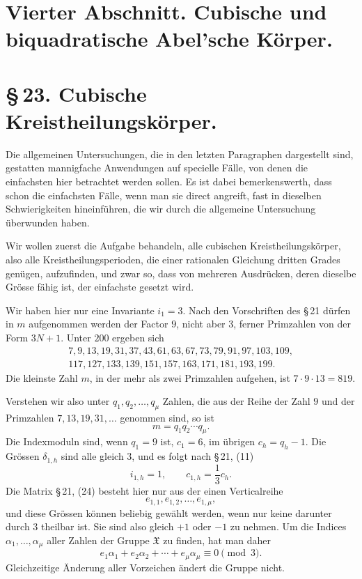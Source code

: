 \documentclass[11pt]{article}
\providecommand{\grpX}{\mathfrak X}
\begin{document}
\section*{Vierter Abschnitt. Cubische und biquadratische Abel'sche Körper.}

\section*{\S\,23. Cubische Kreistheilungskörper.}

Die allgemeinen Untersuchungen, die in den letzten Paragraphen dargestellt sind, gestatten mannigfache Anwendungen auf specielle Fälle, von denen die einfachsten hier betrachtet werden sollen. Es ist dabei bemerkenswerth, dass schon die einfachsten Fälle, wenn man sie direct angreift, fast in dieselben Schwierigkeiten hineinführen, die wir durch die allgemeine Untersuchung überwunden haben.

Wir wollen zuerst die Aufgabe behandeln, alle cubischen Kreistheilungskörper, also alle Kreistheilungsperioden, die einer rationalen Gleichung dritten Grades genügen, aufzufinden, und zwar so, dass von mehreren Ausdrücken, deren dieselbe Grösse fähig ist, der einfachste gesetzt wird.

Wir haben hier nur eine Invariante $i_1=3$. Nach den Vorschriften des \S\,21 dürfen in $m$ aufgenommen werden der Factor $9$, nicht aber $3$, ferner Primzahlen von der Form $3N+1$. Unter $200$ ergeben sich
\[
\begin{gathered}
7,9,13,19,31,37,43,61,63,67,73,79,91,97,103,109,\\
117,127,133,139,151,157,163,171,181,193,199.
\end{gathered}
\]
Die kleinste Zahl $m$, in der mehr als zwei Primzahlen aufgehen, ist $7\cdot9\cdot13=819$.

Verstehen wir also unter $q_1,q_2,\ldots,q_\mu$ Zahlen, die aus der Reihe der Zahl $9$ und der Primzahlen $7,13,19,31,\ldots$ genommen sind, so ist
\begin{equation}
   m=q_1q_2\cdots q_\mu .
   \tag{1}
\end{equation}
Die Indexmoduln sind, wenn $q_1=9$ ist, $c_1=6$, im übrigen $c_h=q_h-1$. Die Grössen $\delta_{1,h}$ sind alle gleich $3$, und es folgt nach \S\,21, (11)
\[
   i_{1,h}=1,
   \qquad c_{1,h}=\frac13c_h .
\]
Die Matrix \S\,21, (24) besteht hier nur aus der einen Verticalreihe
\[
   e_{1,1},e_{1,2},\ldots,e_{1,\mu},
\]
und diese Grössen können beliebig gewählt werden, wenn nur keine darunter durch $3$ theilbar ist. Sie sind also gleich $+1$ oder $-1$ zu nehmen. Um die Indices $\alpha_1,\ldots,\alpha_\mu$ aller Zahlen der Gruppe $\grpX$ zu finden, hat man daher
\begin{equation}
   e_1\alpha_1+e_2\alpha_2+\cdots+e_\mu\alpha_\mu\equiv0\pmod3.
   \tag{2}
\end{equation}
Gleichzeitige Änderung aller Vorzeichen ändert die Gruppe nicht.
\end{document}
